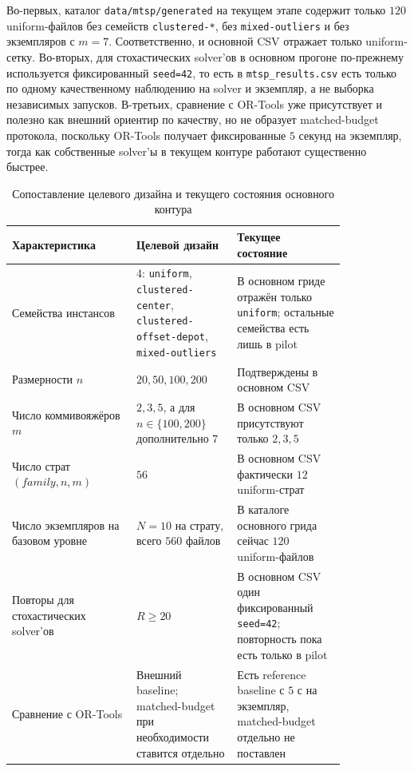 \begin{refsection}
Во-первых, каталог \texttt{data/mtsp/generated} на текущем этапе содержит только \(120\) uniform-файлов без семейств \texttt{clustered-*}, без \texttt{mixed-outliers} и без экземпляров с \(m=7\). Соответственно, и основной CSV отражает только uniform-сетку. Во-вторых, для стохастических solver'ов в основном прогоне по-прежнему используется фиксированный \texttt{seed=42}, то есть в \texttt{mtsp\_results.csv} есть только по одному качественному наблюдению на solver и экземпляр, а не выборка независимых запусков. В-третьих, сравнение с OR-Tools уже присутствует и полезно как внешний ориентир по качеству, но не образует matched-budget протокола, поскольку OR-Tools получает фиксированные \(5\) секунд на экземпляр, тогда как собственные solver'ы в текущем контуре работают существенно быстрее.

\begin{table}[h]
\centering
\caption{Сопоставление целевого дизайна и текущего состояния основного контура}
\begin{tabular}{p{0.31\linewidth}p{0.25\linewidth}p{0.27\linewidth}}
\toprule
Характеристика & Целевой дизайн & Текущее состояние \\
\midrule
Семейства инстансов & \(4\): \texttt{uniform}, \texttt{clustered-center}, \texttt{clustered-offset-depot}, \texttt{mixed-outliers} & В основном гриде отражён только \texttt{uniform}; остальные семейства есть лишь в pilot \\
Размерности \(n\) & \(20, 50, 100, 200\) & Подтверждены в основном CSV \\
Число коммивояжёров \(m\) & \(2,3,5\), а для \(n \in \{100,200\}\) дополнительно \(7\) & В основном CSV присутствуют только \(2,3,5\) \\
Число страт \((family,n,m)\) & \(56\) & В основном CSV фактически \(12\) uniform-страт \\
Число экземпляров на базовом уровне & \(N=10\) на страту, всего \(560\) файлов & В каталоге основного грида сейчас \(120\) uniform-файлов \\
Повторы для стохастических solver'ов & \(R \ge 20\) & В основном CSV один фиксированный \texttt{seed=42}; повторность пока есть только в pilot \\
Сравнение с OR-Tools & Внешний baseline; matched-budget при необходимости ставится отдельно & Есть reference baseline с \(5\) с на экземпляр, matched-budget отдельно не поставлен \\
\bottomrule
\end{tabular}
\end{table}


\end{refsection}
